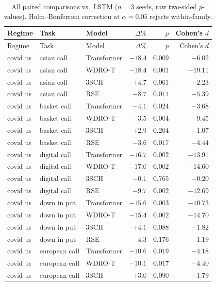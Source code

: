 \documentclass[11pt,oneside]{report}
\begin{document}
\begin{longtable}{lllrrr}
\caption{All paired comparisons vs.\ LSTM ($n=3$ seeds, raw two-sided $p$-values).  Holm--Bonferroni correction at $\alpha=0.05$ rejects within-family.\label{tab:paired_medium_full}}\\
\toprule
Regime & Task & Model & $\Delta\%$ & $p$ & Cohen's $d$ \\\midrule
\endfirsthead
\toprule
Regime & Task & Model & $\Delta\%$ & $p$ & Cohen's $d$ \\\midrule
\endhead
\bottomrule
\endfoot
covid us & asian call & Transformer & $-18.4$ & $0.009$ & $-6.02$ \\
covid us & asian call & WDRO-T      & $-18.4$ & $0.001$ & $-19.11$ \\
covid us & asian call & 3SCH        & $+4.7$  & $0.061$ & $+2.23$ \\
covid us & asian call & RSE         & $-8.7$  & $0.011$ & $-5.39$ \\
covid us & basket call & Transformer & $-4.1$ & $0.024$ & $-3.68$ \\
covid us & basket call & WDRO-T     & $-3.5$  & $0.004$ & $-9.45$ \\
covid us & basket call & 3SCH       & $+2.9$  & $0.204$ & $+1.07$ \\
covid us & basket call & RSE        & $-3.6$  & $0.017$ & $-4.44$ \\
covid us & digital call & Transformer & $-16.7$ & $0.002$ & $-13.91$ \\
covid us & digital call & WDRO-T    & $-17.0$ & $0.002$ & $-14.60$ \\
covid us & digital call & 3SCH      & $-0.1$  & $0.765$ & $-0.20$ \\
covid us & digital call & RSE       & $-9.7$  & $0.002$ & $-12.69$ \\
covid us & down in put & Transformer & $-15.6$ & $0.003$ & $-10.73$ \\
covid us & down in put & WDRO-T     & $-15.4$ & $0.002$ & $-14.70$ \\
covid us & down in put & 3SCH       & $+4.1$  & $0.088$ & $+1.82$ \\
covid us & down in put & RSE        & $-4.3$  & $0.176$ & $-1.19$ \\
covid us & european call & Transformer & $-10.6$ & $0.019$ & $-4.18$ \\
covid us & european call & WDRO-T   & $-10.1$ & $0.017$ & $-4.40$ \\
covid us & european call & 3SCH     & $+3.0$  & $0.090$ & $+1.79$ \\

\end{longtable}
\end{document}
